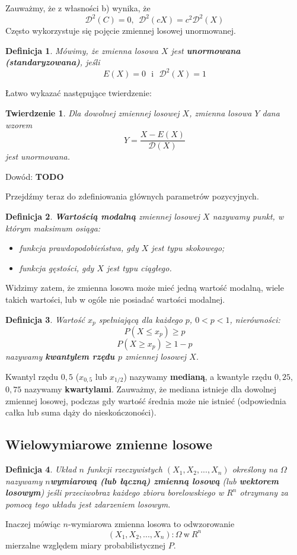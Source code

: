 \documentclass[10pt,a4paper]{article}
\newtheorem{defin}{Definicja}[section]
\newtheorem{twier}{Twierdzenie}[section]
\begin{document}
Zauważmy, że z własności b) wynika, że
\[\mathscr{D}^2(C) = 0,~~\mathscr{D}^2(cX) = c^2\mathscr{D}^2(X)\] 
Często wykorzystuje się pojęcie zmiennej losowej unormowanej.
\begin{defin}
Mówimy, że zmienna losowa $X$ jest \textbf{unormowana (standaryzowana)}, jeśli
\[E(X) = 0 \textrm{~~i~~} \mathscr{D}^2(X)=1\] 
\end{defin}
Łatwo wykazać następujące twierdzenie:
\begin{twier}
Dla dowolnej zmiennej losowej $X$, zmienna losowa $Y$ dana wzorem
\[Y=\frac{X-E(X)}{\mathscr{D}(X)}\]
jest unormowana.
\end{twier}
Dowód: \textbf{TODO}

Przejdźmy teraz do zdefiniowania głównych parametrów pozycyjnych.
\begin{defin}
\textbf{Wartością modalną} zmiennej losowej $X$ nazywamy punkt, w którym maksimum osiąga:
\begin{itemize}
\item funkcja prawdopodobieństwa, gdy $X$ jest typu skokowego;
\item funkcja gęstości, gdy $X$ jest typu ciągłego.
\end{itemize}
\end{defin}
Widzimy zatem, że zmienna losowa może mieć jedną wartość modalną, wiele takich wartości, lub w ogóle nie posiadać wartości modalnej.
\begin{defin}
Wartość $x_p$ spełniającą dla każdego $p$, $0<p<1$, nierówności:
\[P(X\leq x_p)\geq p\]
\[P(X\geq x_p)\geq 1-p\]
nazywamy \textbf{kwantylem rzędu $p$} zmiennej losowej $X$.
\end{defin}
Kwantyl rzędu $0,5$ ($x_{0,5}$ lub $x_{1/2}$) nazywamy \textbf{medianą}, a kwantyle rzędu $0,25$, $0,75$ nazywamy \textbf{kwartylami}.
Zauważmy, że mediana istnieje dla dowolnej zmiennej losowej, podczas gdy wartość średnia może nie istnieć (odpowiednia całka lub suma dąży do nieskończoności).
\subsection{Wielowymiarowe zmienne losowe}
\begin{defin}
Układ $n$ funkcji rzeczywistych $(X_1,X_2,...,X_n)$ określony na $\Omega$ nazywamy \textbf{$n$\dywiz wymiarową (lub łączną) zmienną losową} (lub \textbf{wektorem losowym}) jeśli przeciwobraz każdego zbioru borelowskiego w $R^n$ otrzymany za pomocą tego układu jest zdarzeniem losowym.
\end{defin}
Inaczej mówiąc $n$-wymiarowa zmienna losowa to odwzorowanie 
\[(X_1,X_2,...,X_n):\Omega~\textrm{w}~R^n\]
mierzalne względem miary probabilistycznej $P$.
\end{document}
